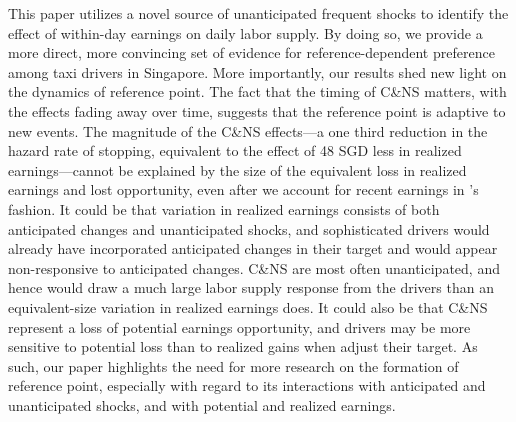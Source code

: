 \documentclass[reviewmode]{restat}
\begin{document}
This paper utilizes a novel source of unanticipated frequent shocks to identify the effect of within-day 
earnings on daily labor supply. By doing so, we provide a more direct, more convincing set of evidence for 
reference-dependent preference among taxi drivers in Singapore. More importantly, our results shed new light 
on the dynamics of reference point. The fact that the timing of C\&NS matters, with the effects fading away
over time, suggests that the reference point is adaptive to new events. The magnitude of the C\&NS effects---a
one third reduction in the hazard rate of stopping, equivalent to the effect of 48 SGD less in realized 
earnings---cannot be explained by the size of the equivalent loss in realized earnings and lost opportunity, 
even after we account for recent earnings in \citet{thakral2018daily}'s fashion. It could be that variation 
in realized earnings consists of both anticipated changes and unanticipated shocks, and sophisticated drivers 
would already have incorporated anticipated changes in their target and would appear non-responsive to
anticipated changes. C\&NS are most often unanticipated, and hence would draw a much large labor supply 
response from the drivers than an equivalent-size variation in realized earnings does. It could also be
that C\&NS represent a loss of potential earnings opportunity, and drivers may be more sensitive to potential
loss than to realized gains when adjust their target. As such, our paper highlights the need for more research
on the formation of reference point, especially with regard to its interactions with anticipated and
unanticipated shocks, and with potential and realized earnings.
\end{document}
